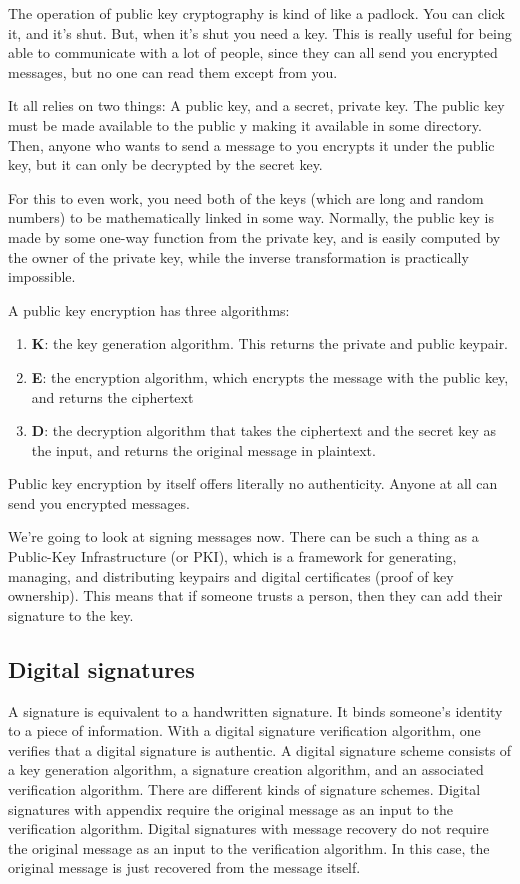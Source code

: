 \documentclass[11pt,a4paper,titlepage]{scrartcl}
\begin{document}
The operation of public key cryptography is kind of like a padlock. You
can click it, and it's shut. But, when it's shut you need a key. This is
really useful for being able to communicate with a lot of people, since
they can all send you encrypted messages, but no one can read them except
from you.

It all relies on two things: A public key, and a secret, private key. The
public key must be made available to the public y making it available in
some directory. Then, anyone who wants to send a message to you encrypts
it under the public key, but it can only be decrypted by the secret key.

For this to even work, you need both of the keys (which are long and
random numbers) to be mathematically linked in some way. Normally, the
public key is made by some one-way function from the private key, and is
easily computed by the owner of the private key, while the inverse
transformation is practically impossible.

A public key encryption has three algorithms:
\begin{enumerate}
    \item \textbf{K}: the key generation algorithm. This returns the
        private and public keypair.
    \item \textbf{E}: the encryption algorithm, which encrypts the message
        with the public key, and returns the ciphertext
    \item \textbf{D}: the decryption algorithm that takes the ciphertext
        and the secret key as the input, and returns the original message
        in plaintext.
\end{enumerate}

Public key encryption by itself offers literally no authenticity. Anyone
at all can send you encrypted messages.

We're going to look at signing messages now. There can be such a thing as
a Public-Key Infrastructure (or PKI), which is a framework for generating,
managing, and distributing keypairs and digital certificates (proof of key
ownership). This means that if someone trusts a person, then they can add
their signature to the key.

\subsection{Digital signatures}%
\label{sub:signatures}

A signature is equivalent to a handwritten signature. It binds someone's
identity to a piece of information. With a digital signature verification
algorithm, one verifies that a digital signature is authentic. A digital
signature scheme consists of a key generation algorithm, a signature
creation algorithm, and an associated verification algorithm. There are
different kinds of signature schemes. Digital signatures with appendix
require the original message as an input to the verification algorithm.
Digital signatures with message recovery do not require the original
message as an input to the verification algorithm. In this case, the
original message is just recovered from the message itself.
\end{document}
